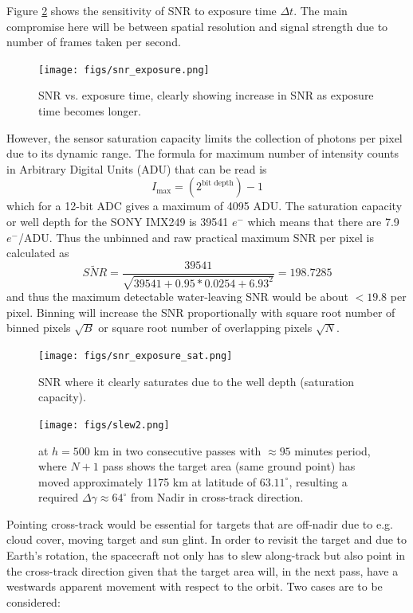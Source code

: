 Figure \ref{fig:snr_exposure} shows the sensitivity of SNR to exposure time $\Delta t$. The main compromise here will be between spatial resolution and signal strength due to number of frames taken per second.
\begin{figure}[H]
  \centering
      \texttt{[image: figs/snr\_exposure.png]}
  \caption{SNR vs. exposure time, clearly showing increase in SNR as exposure time becomes longer.}
	\label{fig:snr_exposure}
\end{figure}
However, the sensor saturation capacity limits the collection of photons per pixel due to its dynamic range. The formula for maximum number of intensity counts in Arbitrary Digital Units (ADU) that can be read is
\begin{equation}
I_{\text{max}}=(2^{\text{bit depth}})-1
\end{equation}
\noindent which for a 12-bit ADC gives a maximum of 4095 ADU. The saturation capacity or well depth for the SONY IMX249 is 39541 $e^-$ which means that there are 7.9 $e^-$/ADU. Thus the unbinned and raw practical maximum SNR per pixel is calculated as
\begin{equation}
\tilde{SNR}=\frac{39541}{\sqrt{39541+0.95*0.0254+6.93^2}}= 198.7285
\end{equation} 
\noindent and thus the maximum detectable water-leaving SNR would be about $<19.8$ per pixel. Binning will increase the SNR proportionally with square root number of binned pixels $\sqrt{B}$ or square root number of overlapping pixels $\sqrt{N}$.
\begin{figure}[H]
  \centering
      \texttt{[image: figs/snr\_exposure\_sat.png]}
  \caption{SNR where it clearly saturates due to the well depth (saturation capacity).}
	\label{fig:snr_exposure}
\end{figure}

\begin{figure}[htbp]
  \centering
      \texttt{[image: figs/slew2.png]}
  \caption{\sml at $h=500$ km in two consecutive passes with $\approx 95$ minutes period, where $N+1$ pass shows the target area (same ground point) has moved approximately 1175 km at latitude of $63.11^{\circ}$, resulting a required $\Delta \gamma\approx 64^{\circ}$ from Nadir in cross-track direction.}
	\label{fig:slew2}
\end{figure}
Pointing cross-track would be essential for targets that are off-nadir due to e.g. cloud cover, moving target and sun glint. In order to revisit the target and due to Earth's rotation, the spacecraft not only has to slew along-track but also point in the cross-track direction given that the target area will, in the next pass, have a westwards apparent movement with respect to the orbit. Two cases are to be considered:

